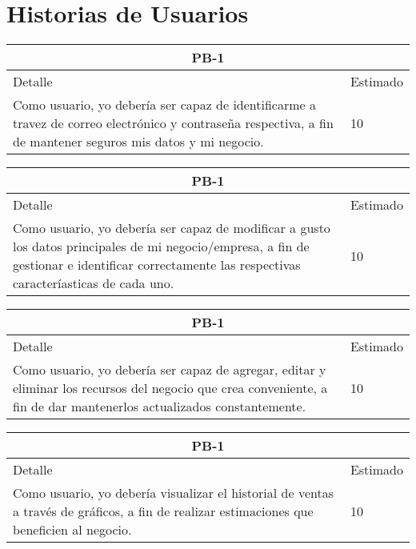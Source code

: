 \chapter{Historias de Usuarios}

\begin{table}[htbp]
	\begin{center}
		\begin{tabular}{|p{12cm} | p{2cm} |}
			\hline
			\multicolumn{2}{|c|}{PB-1}\\
			\hline
			Detalle & Estimado \\
			\hline
			Como usuario, yo debería ser capaz de identificarme a travez de correo electrónico y contraseña respectiva, a fin de mantener seguros mis datos y mi negocio.  & 10 \\
			\hline	
		\end{tabular}
	\end{center}
\end{table}
\begin{table}[htbp]
	\begin{center}
		\begin{tabular}{|p{12cm} | p{2cm} |}
			\hline
			\multicolumn{2}{|c|}{PB-1}\\
			\hline
			Detalle & Estimado \\
			\hline
			Como usuario, yo debería ser capaz de modificar a gusto los datos principales de mi negocio/empresa, a fin de gestionar e identificar correctamente las respectivas caracteríasticas de cada uno.& 10 \\
			\hline	
		\end{tabular}
	\end{center}
\end{table}
\begin{table}[htbp]
	\begin{center}
		\begin{tabular}{| p{12cm} | p{2cm} |}
			\hline
			\multicolumn{2}{|c|}{PB-1}\\
			\hline
			Detalle & Estimado \\
			\hline
			Como usuario, yo debería ser capaz de agregar, editar y eliminar los recursos del negocio que crea conveniente, a fin de dar mantenerlos actualizados constantemente.& 10 \\
			\hline	
		\end{tabular}
	\end{center}
\end{table}
\begin{table}[htbp]
	\begin{center}
		\begin{tabular}{| p{12cm} | p{2cm} |}
			\hline
			\multicolumn{2}{|c|}{PB-1}\\
			\hline
			Detalle & Estimado \\
			\hline
			Como usuario, yo debería visualizar el historial de ventas a través de gráficos, a fin de realizar estimaciones que beneficien al negocio.& 10 \\
			\hline	
		\end{tabular}
	\end{center}
\end{table}
